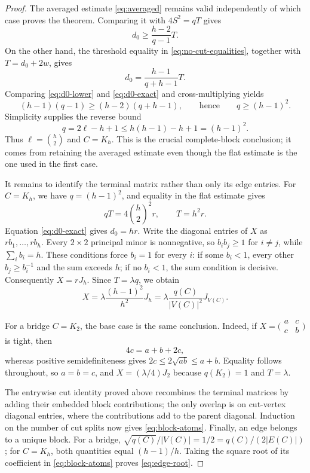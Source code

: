 \documentclass[11pt]{article}
\theoremstyle{remark}
\begin{document}
\begin{proof}
The averaged estimate \eqref{eq:averaged} remains valid independently of
which case proves the theorem.  Comparing it with $4S^2=qT$ gives
\begin{equation}\label{eq:d0-lower}
 d_0\geq\frac{h-2}{q-1}T.
\end{equation}
On the other hand, the threshold equality in
\eqref{eq:no-cut-equalities}, together with $T=d_0+2w$, gives
\begin{equation}\label{eq:d0-exact}
 d_0=\frac{h-1}{q+h-1}T.
\end{equation}
Comparing \eqref{eq:d0-lower} and \eqref{eq:d0-exact} and
cross-multiplying yields
\[
 (h-1)(q-1)\geq(h-2)(q+h-1),
 \qquad\text{hence}\qquad q\geq(h-1)^2.
\]
Simplicity supplies the reverse bound
\[
 q=2\ell-h+1\leq h(h-1)-h+1=(h-1)^2.
\]
Thus $\ell=\binom h2$ and $C=K_h$.  This is the crucial complete-block
conclusion; it comes from retaining the averaged estimate even though the
flat estimate is the one used in the first case.

It remains to identify the terminal matrix rather than only its edge
entries.  For $C=K_h$, we have $q=(h-1)^2$, and equality in the flat estimate
gives
\[
 qT=4\binom h2^2r,
 \qquad T=h^2r.
\]
Equation \eqref{eq:d0-exact} gives $d_0=hr$.  Write the diagonal entries of
$X$ as $rb_1,\ldots,rb_h$.  Every $2\times2$ principal minor is
nonnegative, so $b_ib_j\geq1$ for $i\ne j$, while
$\sum_i b_i=h$.  These conditions force $b_i=1$ for every $i$: if some
$b_i<1$, every other $b_j\geq b_i^{-1}$ and the sum exceeds $h$; if no
$b_i<1$, the sum condition is decisive.  Consequently $X=rJ_h$.  Since
$T=\lambda q$, we obtain
\begin{equation}\label{eq:complete-atom}
 X=\lambda\frac{(h-1)^2}{h^2}J_h
   =\lambda\frac{q(C)}{|V(C)|^2}J_{V(C)}.
\end{equation}

For a bridge $C=K_2$, the base case is the same conclusion.  Indeed, if
$X=\bigl(\begin{smallmatrix}a&c\\c&b\end{smallmatrix}\bigr)$ is tight,
then
\[
 4c=a+b+2c,
 \]
whereas positive semidefiniteness gives
$2c\leq2\sqrt{ab}\leq a+b$.  Equality follows throughout, so
$a=b=c$, and $X=(\lambda/4)J_2$ because $q(K_2)=1$ and $T=\lambda$.

The entrywise cut identity proved above recombines the terminal matrices by
adding their embedded block contributions; the only overlap is on cut-vertex
diagonal entries, where the contributions add to the parent diagonal.
Induction on the number of cut splits now gives \eqref{eq:block-atoms}.
Finally, an edge belongs to a unique block.
For a bridge,
$\sqrt{q(C)}/|V(C)|=1/2=q(C)/(2|E(C)|)$; for $C=K_h$, both quantities equal
$(h-1)/h$.  Taking the square root of its coefficient in
\eqref{eq:block-atoms} proves \eqref{eq:edge-root}.
\end{proof}
\end{document}
